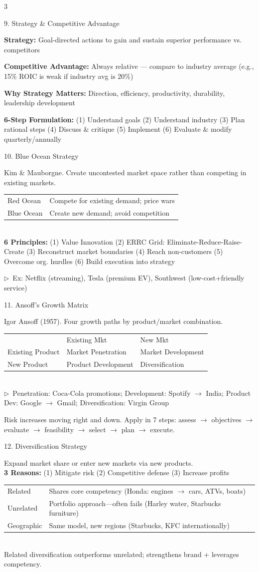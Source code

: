 \documentclass[7.5pt, letterpaper]{article}
\newcommand{\concept}[1]{%
  \vspace{2.5pt}%
  \noindent\colorbox{accent}{\parbox{\dimexpr\linewidth-2\fboxsep}{\fontsize{6.8pt}{7.5pt}\selectfont\bfseries\color{white}\strut #1\strut}}%
  \vspace{1pt}\par%
}
\newcommand{\kv}[2]{\noindent\textbf{#1:} #2\par}
\newcommand{\bul}[1]{\noindent$\triangleright$\ #1\par}
\newcommand{\minitab}[1]{%
  \begingroup
  \fontsize{6.2pt}{7pt}\selectfont
  \setlength{\tabcolsep}{2pt}
  #1
  \endgroup
}
\begin{document}
\begin{multicols}{3}
\concept{9. Strategy \& Competitive Advantage}
\kv{Strategy}{Goal-directed actions to gain and sustain superior performance vs. competitors}
\kv{Competitive Advantage}{Always relative --- compare to industry average (e.g., 15\% ROIC is weak if industry avg is 20\%)}
\kv{Why Strategy Matters}{Direction, efficiency, productivity, durability, leadership development}
\kv{6-Step Formulation}{(1) Understand goals (2) Understand industry (3) Plan rational steps (4) Discuss \& critique (5) Implement (6) Evaluate \& modify quarterly/annually}

\concept{10. Blue Ocean Strategy}
Kim \& Mauborgne. Create uncontested market space rather than competing in existing markets.\\
\minitab{\begin{tabular}{@{}ll@{}}
Red Ocean & Compete for existing demand; price wars\\
Blue Ocean & Create new demand; avoid competition\\
\end{tabular}}\\
\kv{6 Principles}{(1) Value Innovation (2) ERRC Grid: Eliminate-Reduce-Raise-Create (3) Reconstruct market boundaries (4) Reach non-customers (5) Overcome org. hurdles (6) Build execution into strategy}
\bul{Ex: Netflix (streaming), Tesla (premium EV), Southwest (low-cost+friendly service)}

\concept{11. Ansoff's Growth Matrix}
Igor Ansoff (1957). Four growth paths by product/market combination.\\
\minitab{\begin{tabular}{@{}lll@{}}
 & Existing Mkt & New Mkt\\
Existing Product & Market Penetration & Market Development\\
New Product & Product Development & Diversification\\
\end{tabular}}\\
\bul{Penetration: Coca-Cola promotions; Development: Spotify $\to$ India; Product Dev: Google $\to$ Gmail; Diversification: Virgin Group}
Risk increases moving right and down. Apply in 7 steps: assess $\to$ objectives $\to$ evaluate $\to$ feasibility $\to$ select $\to$ plan $\to$ execute.

\concept{12. Diversification Strategy}
Expand market share or enter new markets via new products.\\
\kv{3 Reasons}{(1) Mitigate risk (2) Competitive defense (3) Increase profits}
\minitab{\begin{tabular}{@{}ll@{}}
Related & Shares core competency (Honda: engines $\to$ cars, ATVs, boats)\\
Unrelated & Portfolio approach---often fails (Harley water, Starbucks furniture)\\
Geographic & Same model, new regions (Starbucks, KFC internationally)\\
\end{tabular}}\\
Related diversification outperforms unrelated; strengthens brand + leverages competency.


\end{multicols}
\end{document}
